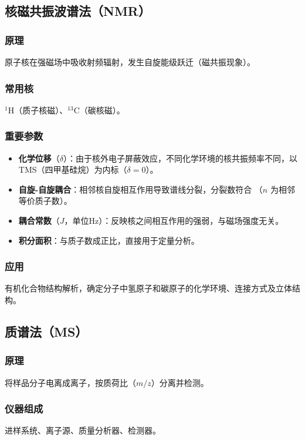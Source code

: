 \documentclass[11pt,a4paper]{article}
\newcommand{\keydef}[1]{\tcbox[on line, colback=lightPink!50,, colframe=subsectionColor!70, boxsep=2pt, arc=2pt]{\textbf{#1}}}
\begin{document}
\subsection{核磁共振波谱法（NMR）}

\subsubsection{原理}
原子核在强磁场中吸收射频辐射，发生自旋能级跃迁（磁共振现象）。

\subsubsection{常用核}
\(^1\)H（质子核磁）、\(^{13}\)C（碳核磁）。

\subsubsection{重要参数}
\begin{itemize}
    \item \textbf{化学位移}（\(\delta\)）：由于核外电子屏蔽效应，不同化学环境的核共振频率不同，以TMS（四甲基硅烷）为内标（\(\delta = 0\)）。
    \item \textbf{自旋-自旋耦合}：相邻核自旋相互作用导致谱线分裂，分裂数符合 \keydef{\(n+1\) 规则}（\( n \) 为相邻等价质子数）。
    \item \textbf{耦合常数}（\( J \)，单位Hz）：反映核之间相互作用的强弱，与磁场强度无关。
    \item \textbf{积分面积}：与质子数成正比，直接用于定量分析。
\end{itemize}

\subsubsection{应用}
有机化合物结构解析，确定分子中氢原子和碳原子的化学环境、连接方式及立体结构。

\subsection{质谱法（MS）}

\subsubsection{原理}
将样品分子电离成离子，按质荷比（\( m/z \)）分离并检测。

\subsubsection{仪器组成}
进样系统、离子源、质量分析器、检测器。
\end{document}
